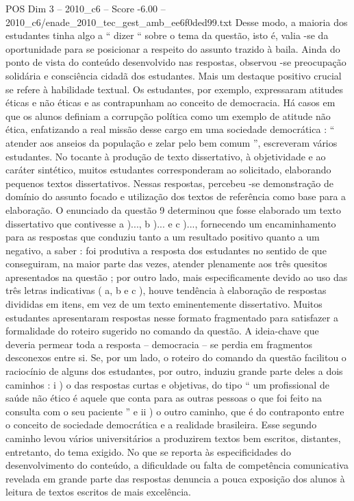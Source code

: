 \begin{textsample}{POS Dim 3 – 2010\_c6 – Score -6.00 – 2010\_c6/enade\_2010\_tec\_gest\_amb\_ee6f0ded99.txt}
Desse modo, a maioria dos estudantes tinha algo a “ dizer “ sobre o tema da questão, isto é, valia -se da oportunidade para se posicionar a respeito do assunto trazido à baila.
Ainda do ponto de vista do conteúdo desenvolvido nas respostas, observou -se preocupação solidária e consciência cidadã dos estudantes.
Mais um destaque positivo crucial se refere à habilidade textual.
Os estudantes, por exemplo, expressaram atitudes éticas e não éticas e as contrapunham ao conceito de democracia.
Há casos em que os alunos definiam a corrupção política como um exemplo de atitude não ética, enfatizando a real missão desse cargo em uma sociedade democrática : “ atender aos anseios da população e zelar pelo bem comum ”, escreveram vários estudantes.
No tocante à produção de texto dissertativo, à objetividade e ao caráter sintético, muitos estudantes corresponderam ao solicitado, elaborando pequenos textos dissertativos.
Nessas respostas, percebeu -se demonstração de domínio do assunto focado e utilização dos textos de referência como base para a elaboração.
O enunciado da questão 9 determinou que fosse elaborado um texto dissertativo que contivesse a )..., b )... e c )..., fornecendo um encaminhamento para as respostas que conduziu tanto a um resultado positivo quanto a um negativo, a saber : foi produtiva a resposta dos estudantes no sentido de que conseguiram, na maior parte das vezes, atender plenamente aos três quesitos apresentados na questão ; por outro lado, mais especificamente devido ao uso das três letras indicativas ( a, b e c ), houve tendência à elaboração de respostas divididas em itens, em vez de um texto eminentemente dissertativo.
Muitos estudantes apresentaram respostas nesse formato fragmentado para satisfazer a formalidade do roteiro sugerido no comando da questão.
A ideia-chave que deveria permear toda a resposta – democracia – se perdia em fragmentos desconexos entre si.
Se, por um lado, o roteiro do comando da questão facilitou o raciocínio de alguns dos estudantes, por outro, induziu grande parte deles a dois caminhos : i ) o das respostas curtas e objetivas, do tipo “ um profissional de saúde não ético é aquele que conta para as outras pessoas o que foi feito na consulta com o seu paciente ” e ii ) o outro caminho, que é do contraponto entre o conceito de sociedade democrática e a realidade brasileira.
Esse segundo caminho levou vários universitários a produzirem textos bem escritos, distantes, entretanto, do tema exigido.
No que se reporta às especificidades do desenvolvimento do conteúdo, a dificuldade ou falta de competência comunicativa revelada em grande parte das respostas denuncia a pouca exposição dos alunos à leitura de textos escritos de mais excelência.

\end{textsample}
